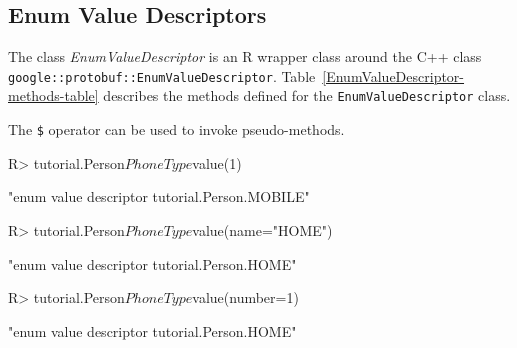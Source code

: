 \documentclass[article]{jss}
\begin{document}
\subsection{Enum Value Descriptors}
\label{subsec-enumvalue-descriptor}

The class \emph{EnumValueDescriptor} is an R wrapper
class around the C++ class \texttt{google::protobuf::EnumValueDescriptor}.
Table~\ref{EnumValueDescriptor-methods-table} describes the methods
defined for the \texttt{EnumValueDescriptor} class.

The \verb|$| operator can be used to invoke pseudo-methods.

\begin{Schunk}
\begin{Sinput}
R> tutorial.Person$PhoneType$value(1)
\end{Sinput}
\begin{Soutput}
[1] "enum value descriptor tutorial.Person.MOBILE"
\end{Soutput}
\begin{Sinput}
R> tutorial.Person$PhoneType$value(name="HOME")
\end{Sinput}
\begin{Soutput}
[1] "enum value descriptor tutorial.Person.HOME"
\end{Soutput}
\begin{Sinput}
R> tutorial.Person$PhoneType$value(number=1)
\end{Sinput}
\begin{Soutput}
[1] "enum value descriptor tutorial.Person.HOME"
\end{Soutput}
\end{Schunk}
\end{document}

